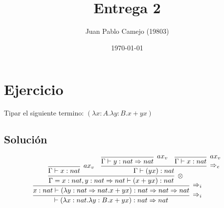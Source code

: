 \documentclass[a4paper,10pt]{article} %
\title{Entrega 2}
\author{Juan Pablo Camejo (19803)}
\date{\today}  %
\begin{document}
\maketitle   %

\section*{Ejercicio}
Tipar el siguiente termino: $(\lambda x:A.\lambda y:B .x+yx)$\\


\subsection*{Solución}
$$
\infer[\Rightarrow_i]{\vdash (\lambda x:nat .\lambda y:B .x+yx) :nat \Rightarrow nat}{
\infer[\Rightarrow_i]{  x:nat \vdash (\lambda y:nat\Rightarrow nat.x + y x) : nat \Rightarrow nat \Rightarrow nat }{
\infer[\otimes]{\Gamma = x:nat,y:nat\Rightarrow nat \vdash  (x + y x) : nat}{
    \infer[ax_v]{\Gamma\vdash x:nat}{} & 
    \infer[\Rightarrow_e]{\Gamma \vdash (yx):nat}{ \infer[ax_v]{\Gamma \vdash y :nat \Rightarrow nat}{} &  \infer[ax_v]{\Gamma \vdash x:nat}{} }
                     }
                      }}
$$
\end{document}

